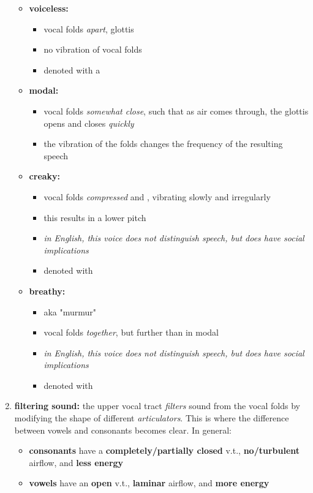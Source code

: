 \documentclass[12pt]{article}
\begin{document}
\begin{enumerate}
  \begin{itemize}
    \item \textbf{voiceless:}\begin{itemize}
      \item vocal folds \textit{apart}, glottis 
      \item no vibration of vocal folds
      \item denoted with a 
    \end{itemize}
    \item \textbf{modal:}\begin{itemize}
      \item vocal folds \textit{somewhat close}, such that as air comes through, the glottis opens and closes \textit{quickly}
      \item the vibration of the folds changes the frequency of the resulting speech
    \end{itemize}
    \item \textbf{creaky:}\begin{itemize}
      \item vocal folds \textit{compressed} and , vibrating slowly and irregularly
      \item this results in a lower pitch
      \item \textit{in English, this voice does not distinguish speech, but does have social implications}
      \item denoted with 
    \end{itemize}
    \item \textbf{breathy:}\begin{itemize}
      \item aka "murmur"
      \item vocal folds \textit{together}, but further than in modal
      \item \textit{in English, this voice does not distinguish speech, but does have social implications}
      \item denoted with 
    \end{itemize}
  \end{itemize}
  \item \textbf{filtering sound:} the upper vocal tract \textit{filters} sound from the vocal folds by modifying the shape of different \textit{articulators}. This is where the difference between vowels and consonants becomes clear. In general: \begin{itemize}
    \item \textbf{consonants} have a \textbf{completely/partially closed} v.t., \textbf{no/turbulent} airflow, and \textbf{less energy}
    \item \textbf{vowels} have an \textbf{open} v.t., \textbf{laminar} airflow, and \textbf{more energy}
  \end{itemize}
\end{enumerate}
\end{document}
